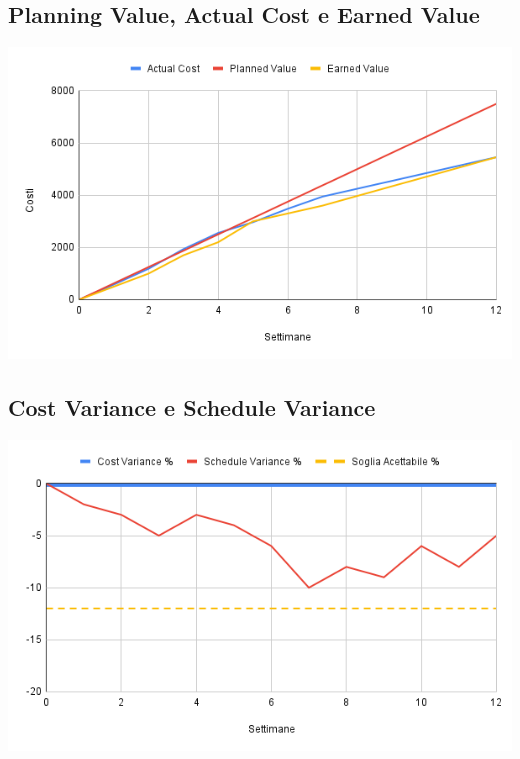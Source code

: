 \documentclass[a4paper, 12pt]{article}
\begin{document}
\subsection{Planning Value, Actual Cost e Earned Value}
\begin{center}
	\includegraphics[scale=0.5]{AC_PV_EV.png}
\end{center}
\subsection{Cost Variance e Schedule Variance}
\begin{center}
	\includegraphics[scale=0.5]{Cost_Variance_Schedule_Variance.png}
\end{center}
\end{document}
